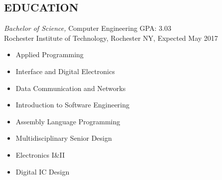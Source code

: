 \documentclass[line,margin]{res}
\begin{document}
\begin{resume}
\section{EDUCATION} {\sl Bachelor of Science,} Computer Engineering GPA: 3.03\\
                Rochester Institute of Technology, Rochester NY, 
				Expected May 2017 %
				\begin{multicols}{2}
					\begin{itemize}
						\itemsep -2pt
						\item[] Applied Programming
						\item[] Interface and Digital Electronics
						\item[] Data Communication and Networks
						\item[] Introduction to Software Engineering
						\item[] Assembly Language Programming
						\item[] Multidisciplinary Senior Design
						\item[] Electronics I\&II
						\item[] Digital IC Design
						
					\end{itemize}
				\end{multicols}
 

\end{resume}
\end{document}
